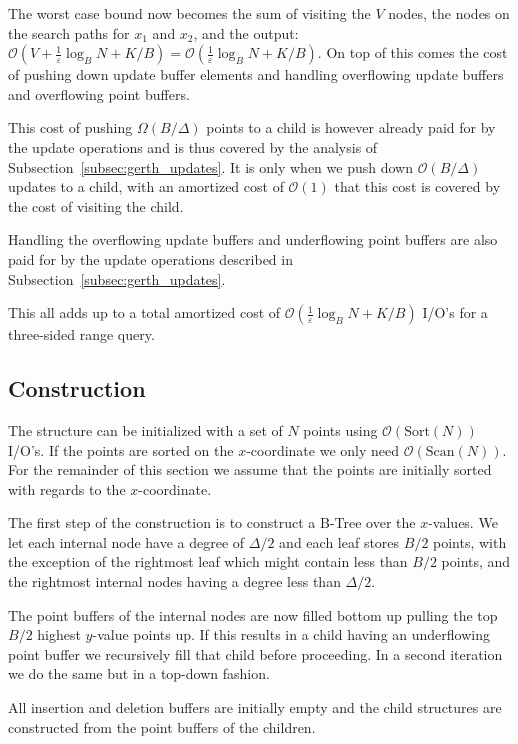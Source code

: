 \documentclass[twoside,11pt,openright]{report}
\def \epsilon {\varepsilon}
\begin{document}
The worst case bound now becomes the sum of visiting the $V$ nodes, the nodes on the search paths for $x_1$ and $x_2$, and the output: $\mathcal{O}(V+\frac{1}{\epsilon}\log_B N + K/B) = \mathcal{O}(\frac{1}{\epsilon}\log_B N + K/B)$.
On top of this comes the cost of pushing down update buffer elements and handling overflowing update buffers and overflowing point buffers.

This cost of pushing $\Omega(B/\Delta)$ points to a child is however already paid for by the update operations and is thus covered by the analysis of Subsection~\ref{subsec:gerth_updates}. It is only when we push down $\mathcal{O}(B/\Delta)$ updates to a child, with an amortized cost of $\mathcal{O}(1)$ that this cost is covered by the cost of visiting the child.

Handling the overflowing update buffers and underflowing point buffers are also paid for by the update operations described in Subsection~\ref{subsec:gerth_updates}.

This all adds up to a total amortized cost of $\mathcal{O}(\frac{1}{\epsilon} \log_B N + K/B)$ I/O's for a three-sided range query.

\subsection{Construction}
The structure can be initialized with a set of $N$ points using $\mathcal{O}(\text{Sort}(N))$ I/O's. If the points are sorted on the $x$-coordinate we only need $\mathcal{O}(\text{Scan}(N))$. For the remainder of this section we assume that the points are initially sorted with regards to the $x$-coordinate.

The first step of the construction is to construct a B-Tree over the $x$-values. We let each internal node have a degree of $\Delta/2$ and each leaf stores $B/2$ points, with the exception of the rightmost leaf which might contain less than $B/2$ points, and the rightmost internal nodes having a degree less than $\Delta/2$.

The point buffers of the internal nodes are now filled bottom up pulling the top $B/2$ highest $y$-value points up. If this results in a child having an underflowing point buffer we recursively fill that child before proceeding. In a second iteration we do the same but in a top-down fashion.

All insertion and deletion buffers are initially empty and the child structures are constructed from the point buffers of the children.
\end{document}

